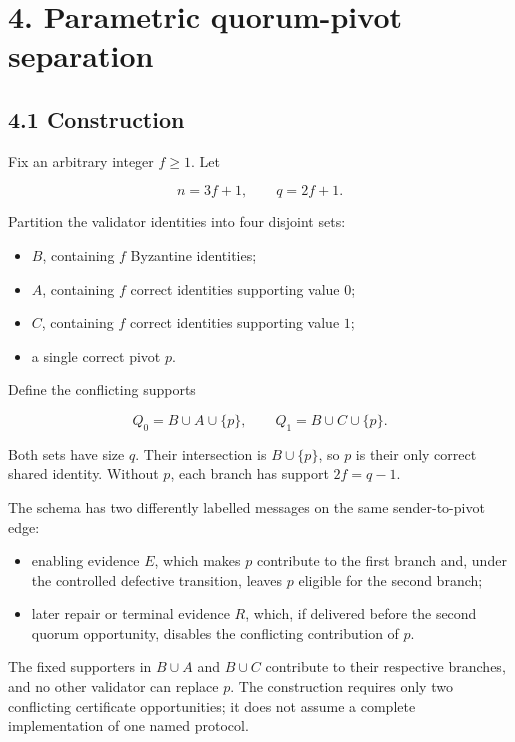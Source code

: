 \documentclass[10pt,a4paper]{article}
\newcommand{\tightlist}{\setlength{\itemsep}{0pt}\setlength{\parskip}{0pt}}
\begin{document}
\section{4. Parametric quorum-pivot
separation}\label{parametric-quorum-pivot-separation}

\subsection{4.1 Construction}\label{construction}

Fix an arbitrary integer \(f\geq1\). Let

\[
n=3f+1,\qquad q=2f+1.
\]

Partition the validator identities into four disjoint sets:

\begin{itemize}
\tightlist
\item
  \(B\), containing \(f\) Byzantine identities;
\item
  \(A\), containing \(f\) correct identities supporting value \(0\);
\item
  \(C\), containing \(f\) correct identities supporting value \(1\);
\item
  a single correct pivot \(p\).
\end{itemize}

Define the conflicting supports

\[
Q_0=B\cup A\cup\{p\},\qquad Q_1=B\cup C\cup\{p\}.
\]

Both sets have size \(q\). Their intersection is \(B\cup\{p\}\), so
\(p\) is their only correct shared identity. Without \(p\), each branch
has support \(2f=q-1\).

The schema has two differently labelled messages on the same
sender-to-pivot edge:

\begin{itemize}
\tightlist
\item
  enabling evidence \(E\), which makes \(p\) contribute to the first
  branch and, under the controlled defective transition, leaves \(p\)
  eligible for the second branch;
\item
  later repair or terminal evidence \(R\), which, if delivered before
  the second quorum opportunity, disables the conflicting contribution
  of \(p\).
\end{itemize}

The fixed supporters in \(B\cup A\) and \(B\cup C\) contribute to their
respective branches, and no other validator can replace \(p\). The
construction requires only two conflicting certificate opportunities; it
does not assume a complete implementation of one named protocol.
\end{document}
